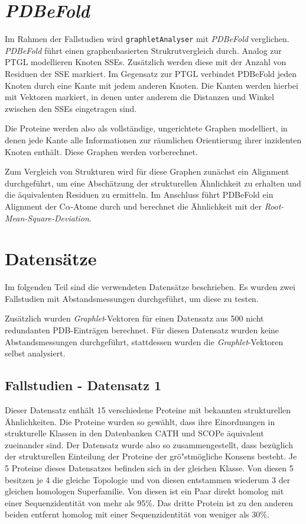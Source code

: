 \documentclass{report}
\begin{document}
\section{\textit{PDBeFold}}

Im Rahmen der Fallstudien wird \texttt{graphletAnalyser} mit \textit{PDBeFold} \cite{pdbefold} verglichen. \textit{PDBeFold} f\"uhrt einen graphenbasierten Strukrutvergleich durch. Analog zur PTGL modellieren Knoten SSEs. Zus\"atzlich werden diese mit der Anzahl von Residuen der SSE markiert. Im Gegensatz zur PTGL verbindet PDBeFold jeden Knoten durch eine Kante mit jedem anderen Knoten. Die Kanten werden hierbei mit Vektoren markiert, in denen unter anderem die Distanzen und Winkel zwischen den SSEs eingetragen sind.

Die Proteine werden also als vollst\"andige, ungerichtete Graphen modelliert, in denen jede Kante alle Informationen zur r\"aumlichen Orientierung ihrer inzidenten Knoten enth\"alt. Diese Graphen werden vorberechnet.

Zum Vergleich von Strukturen wird f\"ur diese Graphen zun\"achst ein Alignment durchgef\"uhrt, um eine Absch\"atzung der strukturellen \"Ahnlichkeit zu erhalten und die \"aquivalenten Residuen zu ermitteln. Im Anschluss f\"uhrt PDBeFold ein Alignment der C$\alpha$-Atome durch und berechnet die \"Ahnlichkeit mit der \textit{Root-Mean-Square-Deviation}.


\section{Datens\"atze}

Im folgenden Teil sind die verwendeten Datens\"atze beschrieben. Es wurden zwei Fallstudien mit Abstandsmessungen durchgef\"uhrt, um diese zu testen.

Zus\"atzlich wurden \textit{Graphlet}-Vektoren f\"ur einen Datensatz aus 500 nicht redundanten PDB-Eintr\"agen berechnet. F\"ur diesen Datensatz wurden keine Abstandsmessungen durchgef\"uhrt, stattdessen wurden die \textit{Graphlet}-Vektoren selbst analysiert.


\subsection{Fallstudien  - Datensatz 1}


Dieser Datensatz enth\"alt 15 verschiedene Proteine mit bekannten strukturellen \"Ahnlichkeiten. Die Proteine wurden so gew\"ahlt, dass ihre Einordnungen in strukturelle Klassen in den Datenbanken CATH und SCOPe \"aquivalent zueinander sind.
Der Datensatz wurde also so zusammengestellt, dass bez\"uglich der strukturellen Einteilung der Proteine der gr\"o"stm\"ogliche Konsens besteht.
Je 5 Proteine dieses Datensatzes befinden sich in der gleichen Klasse. Von diesen 5 besitzen je 4 die gleiche Topologie und von diesen entstammen wiederum 3 der gleichen homologen Superfamilie. Von diesen ist ein Paar direkt homolog mit einer Sequenzidentit\"at von mehr als 95\%. Das dritte Protein ist zu den anderen beiden entfernt homolog mit einer Sequenzidentit\"at von weniger als 30\%.
\end{document}
